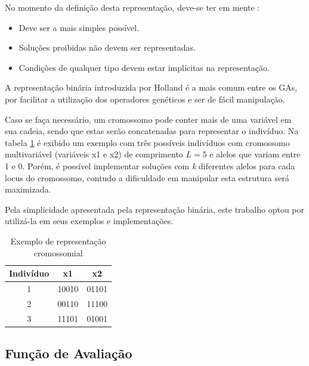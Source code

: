 	No momento da definição desta representação, deve-se ter em mente \cite{Linden2008}:
	
	\begin{itemize}
\item Deve ser a mais simples possível.
\item Soluções proibidas não devem ser representadas. 
\item Condições de qualquer tipo devem estar implícitas na representação.
\end{itemize} 
	
	A representação binária introduzida por Holland \cite{Holland} é a mais comum entre os GAs, por facilitar a utilização dos operadores genéticos e ser de fácil manipulação.
	
	Caso se faça necessário, um cromossomo pode conter mais de uma variável em sua cadeia, sendo que estas serão concatenadas para representar o indivíduo. Na tabela \ref{tabCromo} é exibido um exemplo com três possíveis indivíduos com cromossomo multivariável (variáveis x1 e x2) de comprimento $L = 5$ e alelos que variam entre 1 e 0. Porém, é possível implementar soluções com \textit{k} diferentes alelos para cada locus do cromossomo, contudo a dificuldade em manipular esta estrutura será maximizada.
	
	Pela simplicidade apresentada pela representação binária, este trabalho optou por utilizá-la em seus exemplos e implementações. 
	
	\begin{table}[htp]
 \caption{\label{tabCromo}Exemplo de representação cromossomial}
 \begin{center}
  \begin{tabular}{c|c|c}
   \hline
   Indivíduo & x1  & x2 \\
   \hline
   1 & 10010    & 01101 \\
   2 & 00110    & 11100 \\
   3 & 11101		& 01001 \\ 
   \hline
   \end{tabular}
 \end{center}
\end{table}

	
	\subsection{Função de Avaliação}
	
